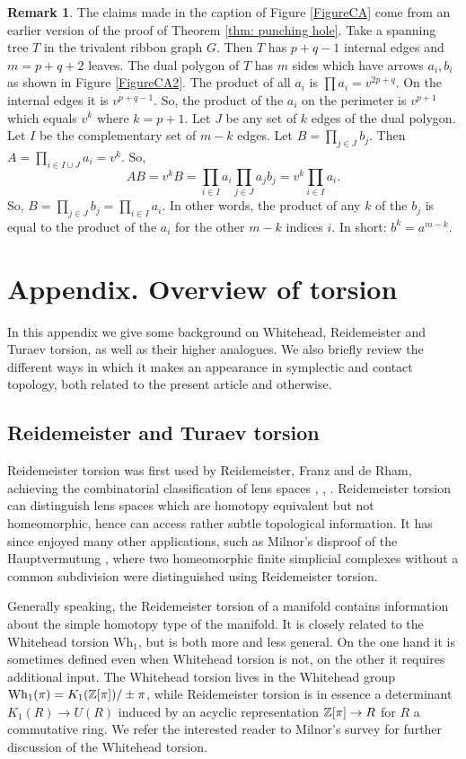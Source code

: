 \documentclass[11pt]{article}
\numberwithin{equation}{section}\providecommand{\dpl}{\displaystyle}
\newcommand{\Wh}{\mathrm{Wh}}
\theoremstyle{plain}
\theoremstyle{definition}
\newtheorem{remark}[theorem]{Remark}
\begin{document}
\begin{remark}\label{proof of JKS}
The claims made in the caption of Figure \ref{FigureCA} come from an earlier version of the proof of Theorem \ref{thm: punching hole}. Take a spanning tree $T$ in the trivalent ribbon graph $G$. Then $T$ has $p+q-1$ internal edges and $m=p+q+2$ leaves. The dual polygon of $T$ has $m$ sides which have arrows $a_i,b_i$ as shown in Figure \ref{FigureCA2}. The product of all $a_i$ is $\prod a_i=v^{2p+q}$. On the internal edges it is $v^{p+q-1}$. So, the product of the $a_i$ on the perimeter is $v^{p+1}$ which equals $v^k$ where $k=p+1$. Let $J$ be any set of $k$ edges of the dual polygon. Let $I$ be the complementary set of $m-k$ edges. Let $B=\prod_{j\in J} b_j$. Then $A=\prod_{i\in I\cup J}a_i=v^k$. So,
\[
AB=v^kB=\prod_{i\in I} a_i\prod_{j\in J} a_jb_j=v^{k}\prod_{i\in I}a_i.
\]
So, $B=\prod_{j\in J} b_j=\prod_{i\in I}a_i$. In other words, the product of any $k$ of the $b_j$ is equal to the product of the $a_i$ for the other $m-k$ indices $i$. In short: $b^k=a^{m-k}$.
\end{remark}

\appendix
\section*{Appendix. Overview of torsion}\label{ap:torsion}
In this appendix we give some background on Whitehead, Reidemeister and Turaev torsion, as well as their higher analogues. We also briefly review the different ways in which it makes an appearance in symplectic and contact topology, both related to the present article and otherwise.

\subsection{Reidemeister and Turaev torsion}

Reidemeister torsion was first used by Reidemeister, Franz and de Rham, achieving the combinatorial classification of lens spaces \cite{R35}, \cite{F35}, \cite{dR39}. Reidemeister torsion can distinguish lens spaces which are homotopy equivalent but not homeomorphic, hence can access rather subtle topological information. It has since enjoyed many other applications, such as Milnor's disproof of the Hauptvermutung \cite{M61}, where two homeomorphic finite simplicial complexes without a common subdivision were distinguished using Reidemeister torsion.

Generally speaking, the Reidemeister torsion of a manifold contains information about the simple homotopy type of the manifold. It is closely related to the Whitehead torsion $\Wh_1$, but is both more and less general. On the one hand it is sometimes defined even when Whitehead torsion is not, on the other it requires additional input. The Whitehead torsion lives in the Whitehead group $\Wh_1(\pi)=K_1(\bZ[\pi])/\pm \pi$, while Reidemeister torsion is in essence a determinant $K_1(R) \to U(R)$ induced by an acyclic representation $\mathbb{Z}[\pi] \to R$ for $R$ a commutative ring. We refer the interested reader to Milnor's survey \cite{M66} for further discussion of the Whitehead torsion.
\end{document}
